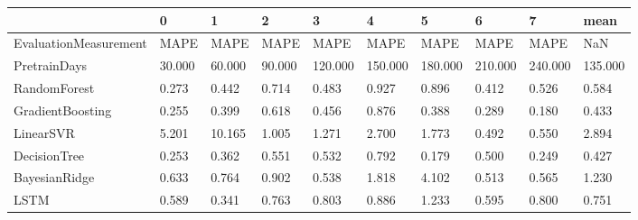 \begin{tabular}{llllllllll}
\toprule
{} &      0 &      1 &      2 &       3 &       4 &       5 &       6 &       7 &    mean \\
\midrule
EvaluationMeasurement &   MAPE &   MAPE &   MAPE &    MAPE &    MAPE &    MAPE &    MAPE &    MAPE &     NaN \\
PretrainDays          & 30.000 & 60.000 & 90.000 & 120.000 & 150.000 & 180.000 & 210.000 & 240.000 & 135.000 \\
RandomForest          &  0.273 &  0.442 &  0.714 &   0.483 &   0.927 &   0.896 &   0.412 &   0.526 &   0.584 \\
GradientBoosting      &  0.255 &  0.399 &  0.618 &   0.456 &   0.876 &   0.388 &   0.289 &   0.180 &   0.433 \\
LinearSVR             &  5.201 & 10.165 &  1.005 &   1.271 &   2.700 &   1.773 &   0.492 &   0.550 &   2.894 \\
DecisionTree          &  0.253 &  0.362 &  0.551 &   0.532 &   0.792 &   0.179 &   0.500 &   0.249 &   0.427 \\
BayesianRidge         &  0.633 &  0.764 &  0.902 &   0.538 &   1.818 &   4.102 &   0.513 &   0.565 &   1.230 \\
LSTM                  &  0.589 &  0.341 &  0.763 &   0.803 &   0.886 &   1.233 &   0.595 &   0.800 &   0.751 \\
\bottomrule
\end{tabular}
